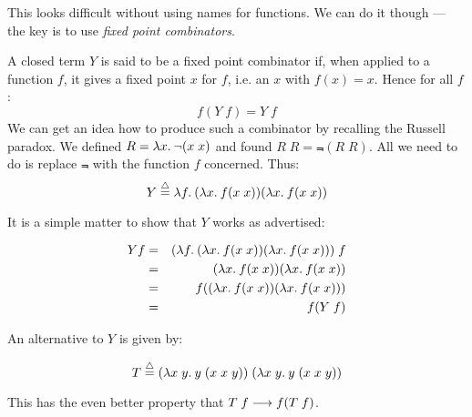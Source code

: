 \begin{slide*}


\vspace*{0.5cm}

This looks difficult without using names for functions. We can do it though ---
the key is to use {\em fixed point combinators}.

A closed term {\red $Y$} is said to be a fixed point combinator if, when applied to a
function {\red $f$}, it gives a fixed point {\red $x$} for {\red $f$}, i.e. an {\red $x$} with {\red $f(x) = x$}.
Hence for all {\red $f$}:
{\red $$ f(Y\; f) = Y\; f $$}
We can get an idea how to produce such a combinator by recalling the Russell
paradox. We defined {\red $R = \lambda x.\: \neg (x\; x)$} and found {\red $R\; R =
\Not (R\; R)$}. All we need to do is replace {\red $\Not$} with the
function {\red $f$} concerned. Thus:
{\red $$Y \stackrel{\bigtriangleup}{=} \lambda f.\: (\lambda x.\: f(x\; x)) (\lambda x.\: f(x\; x))$$}

\end{slide*}


\begin{slide*}


\vspace*{0.5cm}

It is a simple matter to show that {\red $Y$} works as advertised:

\begin{red}
\begin{eqnarray*}
Y f  & = & (\lambda f.\: (\lambda x.\: f(x\; x)) (\lambda x.\: f(x\; x)))\; f       \\
     & = & (\lambda x.\: f(x\; x)) (\lambda x.\: f(x\; x))                      \\
     & = & f((\lambda x.\: f(x\; x)) (\lambda x.\: f(x\; x)))                   \\
     & = & f(Y\; f)
\end{eqnarray*}
\end{red}

An alternative to $Y$ is given by:

{\red $$ T \stackrel{\bigtriangleup}{=} (\lambda x\; y.\: y\; (x\; x\; y))\; (\lambda x\; y.\: y\; (x\; x\;
y)) $$}

This has the even better property that {\red $T\; f \longrightarrow f(T\; f)$}.

\end{slide*}


